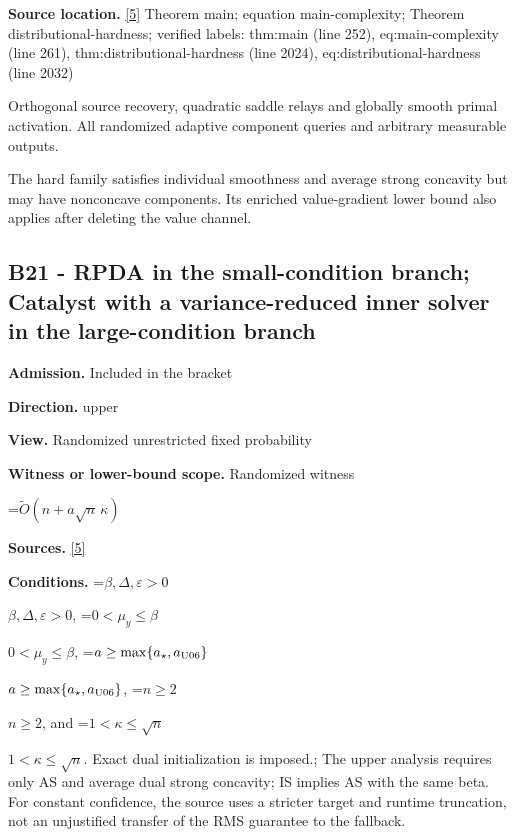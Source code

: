 \documentclass[10pt,a4paper]{article}
\newcommand{\AtlasMath}[1]{\par\begingroup\centering\setbox0=\hbox{$\displaystyle #1$}\ifdim\wd0>1.4\linewidth\typeout{ATLAS WIDE FORMULA: \the\wd0}\fi\ifdim\wd0>\linewidth\resizebox{\linewidth}{!}{\box0}\else\box0\fi\par\endgroup}
\newcommand{\AtlasInlineMath}[1]{\begingroup\setbox0=\hbox{$#1$}\ifdim\wd0>.4\linewidth\endgroup\AtlasMath{#1}\else\endgroup$#1$\fi}
\begin{document}
\textbf{Source location.} \href{https://github.com/WU-Wendao/Colombo/blob/main/colombo_sensorium/Complexity_altas/data/sources/colombo/U06/manuscript.pdf}{[5]} Theorem main; equation main-complexity; Theorem distributional-hardness; verified labels: thm:main (line 252), eq:main-complexity (line 261), thm:distributional-hardness (line 2024), eq:distributional-hardness (line 2032)



Orthogonal source recovery, quadratic saddle relays and globally smooth primal activation. All randomized adaptive component queries and arbitrary measurable outputs.



The hard family satisfies individual smoothness and average strong concavity but may have nonconcave components. Its enriched value-gradient lower bound also applies after deleting the value channel.



\subsection{B21 - RPDA in the small-condition branch; Catalyst with a variance-reduced inner solver in the large-condition branch}


\textbf{Admission.} Included in the bracket



\textbf{Direction.} upper



\textbf{View.} Randomized unrestricted fixed probability



\textbf{Witness or lower-bound scope.} Randomized witness



\AtlasMath{\widetilde O(n+a\sqrt n\,\kappa)}


\textbf{Sources.} \href{https://github.com/WU-Wendao/Colombo/blob/main/colombo_sensorium/Complexity_altas/data/sources/colombo/U06/manuscript.pdf}{[5]}



\textbf{Conditions.} \AtlasInlineMath{\beta,\Delta,\varepsilon>0}, \AtlasInlineMath{0<\mu_y\le\beta}, \AtlasInlineMath{a\ge\max\{a_\star,a_{\rm U06}\}}, \AtlasInlineMath{n\ge2}, and \AtlasInlineMath{1<\kappa\le\sqrt n}. Exact dual initialization is imposed.; The upper analysis requires only AS and average dual strong concavity; IS implies AS with the same beta. For constant confidence, the source uses a stricter target and runtime truncation, not an unjustified transfer of the RMS guarantee to the fallback.
\end{document}
